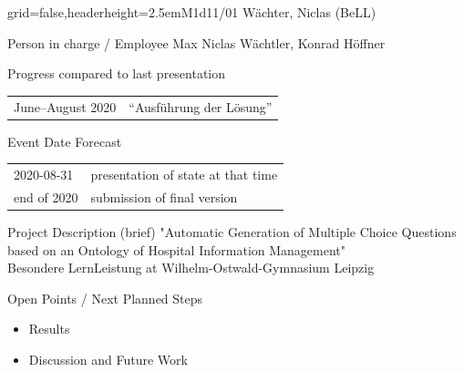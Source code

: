 \documentclass[english]{kiesgrube}
\begin{document}
\newpage

\begin{poster}{grid=false,headerheight=2.5em}{}{M1d11/01 Wächter, Niclas (BeLL)}{}{}
\begin{posterbox}[name=person,column=0,row=0]{Person in charge / Employee}
Max Niclas Wächtler, Konrad Höffner
\end{posterbox}
\begin{posterbox}[name=progress,below=person]{Progress compared to last presentation}
\begin{tabulary}{\textwidth}{lL}
June--August 2020	&\enquote{Ausführung der Lösung}\\
\end{tabulary}
\end{posterbox}
\begin{posterbox}[name=event,below=progress]{Event Date Forecast}
\begin{tabulary}{\textwidth}{lL}
2020-08-31	&presentation of state at that time\\
end of 2020	&submission of final version\\
\end{tabulary}
\end{posterbox}
\begin{posterbox}[name=description,column=1,row=0]{Project Description (brief)}
\small
"Automatic Generation of Multiple Choice Questions based on an Ontology of Hospital Information Management"\\
Besondere LernLeistung at Wilhelm-Ostwald-Gymnasium Leipzig
\end{posterbox}
\begin{posterbox}[name=open,column=1,below=description]{Open Points / Next Planned Steps}
\begin{itemize}
\item Results
\item Discussion and Future Work
\end{itemize}

\end{posterbox}
\end{poster}
\end{document}

